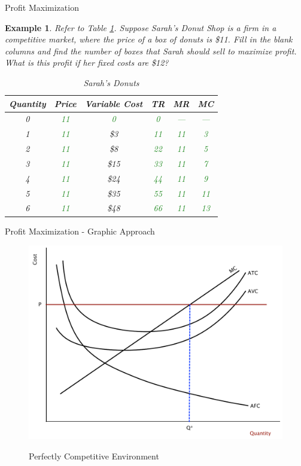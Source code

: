 \documentclass[xcolor={dvipsnames},pdf, hyperref={colorlinks=true, citecolor=ForestGreen, linkcolor=BlueViolet, urlcolor=Magenta}, handout]{beamer}
\newtheorem{exmp}{Example}[section]
\newcommand{\ddp}[1]{{\textcolor{ForestGreen}{#1}}}
\begin{document}
\begin{frame}{Profit Maximization}
	\begin{exmp}
		\scriptsize
	Refer to Table \ref{donuts}. Suppose Sarah's Donut Shop is a firm in a competitive market, where the price of a box of donuts is \$11. Fill in the blank columns and find the number of boxes that Sarah should sell to maximize profit. What is this profit if her fixed costs are \$12?
	\pagebreak
	\begin{table}[ht]
		\centering
		\caption{Sarah's Donuts}
		\label{donuts}
		\begin{tabular}{ c|c|c|c|c|c}        
			
			Quantity & Price & Variable Cost  & TR & MR & MC \\
			\hline
			0 & \ddp{11} &  \ddp{0} &  \ddp{0} &  \ddp{---} &  \ddp{---} \\
			1 &  \ddp{11} & \$3 &  \ddp{11} &  \ddp{11} &  \ddp{3} \\
			2 &  \ddp{11} & \$8 &  \ddp{22} &  \ddp{11} &  \ddp{5}\\
			3 &  \ddp{11} & \$15 &  \ddp{33} & \ddp{11}  &  \ddp{7}\\
			4 &  \ddp{11} & \$24 &  \ddp{44} &  \ddp{11}&  \ddp{9} \\
			5 & \ddp{11} & \$35 &  \ddp{55} & \ddp{11} & \ddp{11} \\
			6 & \ddp{11} & \$48 &   \ddp{66}& \ddp{11} & \ddp{13} \\
		\end{tabular}
	\end{table} 
\end{exmp} 
\end{frame}

\begin{frame}[b]{Profit Maximization - Graphic Approach}
	
	\begin{figure}[H]
		\centering
	\ddp{	\includegraphics[scale=.35]{plot61.pdf}}
		\caption{Perfectly Competitive Environment}
	\end{figure}
	
\end{frame}
\end{document}
